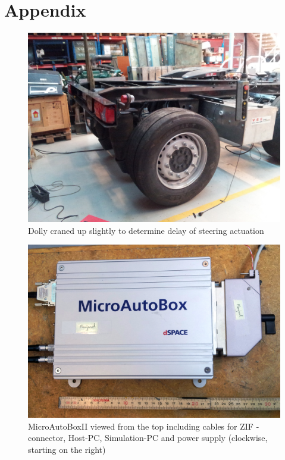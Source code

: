 \documentclass[ExampleMasters.tex]{subfiles}
\begin{document}
\clearpage
\appendix 
{}

\chapter{Appendix}
\label{chap:Appendix}

\begin{figure}[h]
\centering
\includegraphics[width=1\linewidth]{figures/dolly_craned_up}
\caption{Dolly craned up slightly to determine delay of steering actuation}
\label{fig:dolly_craned_up}
\end{figure}

\begin{figure}[h]
	\centering
	\includegraphics[width=1\linewidth]{figures/MABII_topview_cropped}
	\caption{MicroAutoBoxII viewed from the top including cables for \gls{ZIF} -connector, Host-PC, Simulation-PC and power supply (clockwise, starting on the right)}
	\label{fig:microautobox_topview}
\end{figure}
\end{document}

